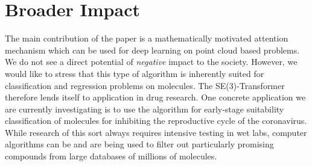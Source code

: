 \section*{Broader Impact}

The main contribution of the paper is a mathematically motivated attention mechanism which can be used for deep learning on point cloud based problems. We do not see a direct potential of \textit{negative} impact to the society. However, we would like to stress that this type of algorithm is inherently suited for classification and regression problems on molecules. The SE(3)-Transformer therefore lends itself to application in drug research. One concrete application we are currently investigating is to use the algorithm for early-stage suitability classification of molecules for inhibiting the reproductive cycle of the coronavirus. While research of this sort always requires intensive testing in wet labs, computer algorithms can be and are being used to filter out particularly promising compounds from large databases of millions of molecules.